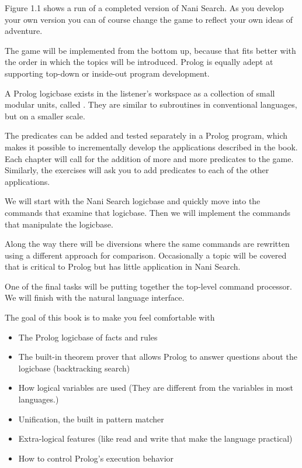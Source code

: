 Figure 1.1 shows a run of a completed version of Nani Search. As you develop
your own version you can of course change the game to reflect your own ideas of
adventure.

The game will be implemented from the bottom up, because that fits better with
the order in which the topics will be introduced. Prolog is equally adept at
supporting top-down or inside-out program development.

A Prolog logicbase exists in the listener's workspace as a collection of small
modular units, called . They are similar to subroutines in
conventional languages, but on a smaller scale.

The predicates can be added and tested separately in a Prolog program, which
makes it possible to incrementally develop the applications described in the
book. Each chapter will call for the addition of more and more predicates to the
game. Similarly, the exercises will ask you to add predicates to each of the
other applications.

We will start with the Nani Search logicbase and quickly move into the commands
that examine that logicbase. Then we will implement the commands that manipulate
the logicbase.

Along the way there will be diversions where the same commands are rewritten
using a different approach for comparison. Occasionally a topic will be covered
that is critical to Prolog but has little application in Nani Search.

One of the final tasks will be putting together the top-level command processor.
We will finish with the natural language interface.

The goal of this book is to make you feel comfortable with
\begin{itemize}[nosep]
  \item 
The Prolog logicbase of facts and rules
  \item 
The built-in theorem prover that allows Prolog to answer questions about the
logicbase (backtracking search)
  \item 
How logical variables are used (They are different from the variables in most
languages.)
  \item 
Unification, the built in pattern matcher
  \item 
Extra-logical features (like read and write that make the language practical)
  \item 
How to control Prolog's execution behavior
\end{itemize}

